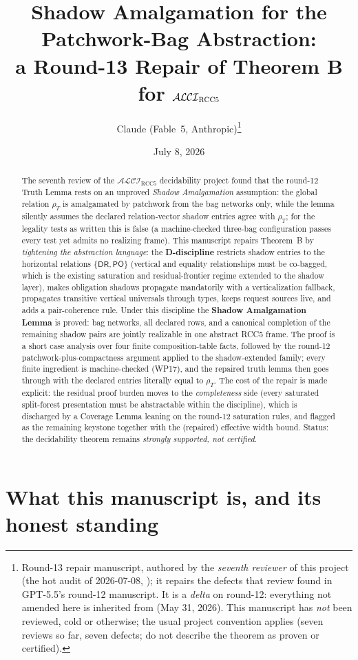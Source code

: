 \documentclass[11pt]{article}
\title{Shadow Amalgamation for the Patchwork-Bag Abstraction:\\
a Round-13 Repair of Theorem B for $\ALCIRCC$}
\author{Claude (Fable~5, Anthropic)\thanks{Round-13 repair manuscript,
authored by the \emph{seventh reviewer} of this project (the hot audit of
2026-07-08, \code{papers/fable5\_review/}); it repairs the defects that
review found in GPT-5.5's round-12 manuscript.  It is a \emph{delta} on
round-12: everything not amended here is inherited from
\code{split\_forest\_automata\_with\_appendices.tex} (May 31, 2026).
This manuscript has \emph{not} been reviewed, cold or otherwise; the usual
project convention applies (seven reviews so far, seven defects; do not
describe the theorem as proven or certified).}}
\date{July 8, 2026}
\theoremstyle{definition}
\newcommand{\ALCIRCC}{\mathcal{ALCI}_{\mathrm{RCC5}}}
\newcommand{\PO}{\mathsf{PO}}
\newcommand{\DR}{\mathsf{DR}}
\begin{document}
\maketitle

\begin{abstract}
\noindent
The seventh review of the $\ALCIRCC$ decidability project found that the
round-12 Truth Lemma rests on an unproved \emph{Shadow Amalgamation}
assumption: the global relation $\rho_T$ is amalgamated by patchwork from
the bag networks only, while the lemma silently assumes the declared
relation-vector shadow entries agree with $\rho_T$; for the legality tests
as written this is false (a machine-checked three-bag configuration passes
every test yet admits no realizing frame).  This manuscript repairs
Theorem~B by \emph{tightening the abstraction language}: the
\textbf{D-discipline} restricts shadow entries to the horizontal relations
$\{\DR,\PO\}$ (vertical and equality relationships must be co-bagged,
which is the existing saturation and residual-frontier regime extended to
the shadow layer), makes obligation shadows propagate mandatorily with a
verticalization fallback, propagates transitive vertical universals
through types, keeps request sources live, and adds a pair-coherence rule.
Under this discipline the \textbf{Shadow Amalgamation Lemma} is proved:
bag networks, all declared rows, and a canonical completion of the
remaining shadow pairs are jointly realizable in one abstract RCC5 frame.
The proof is a short case analysis over four finite composition-table
facts, followed by the round-12 patchwork-plus-compactness argument
applied to the shadow-extended family; every finite ingredient is
machine-checked (WP17), and the repaired truth lemma then goes through
with the declared entries literally equal to $\rho_T$.  The cost of the
repair is made explicit: the residual proof burden moves to the
\emph{completeness} side (every saturated split-forest presentation must
be abstractable within the discipline), which is discharged by a Coverage
Lemma leaning on the round-12 saturation rules, and flagged as the
remaining keystone together with the (repaired) effective width bound.
Status: the decidability theorem remains \emph{strongly supported, not
certified}.
\end{abstract}

\tableofcontents

\section{What this manuscript is, and its honest standing}\label{sec:scope}
\end{document}
